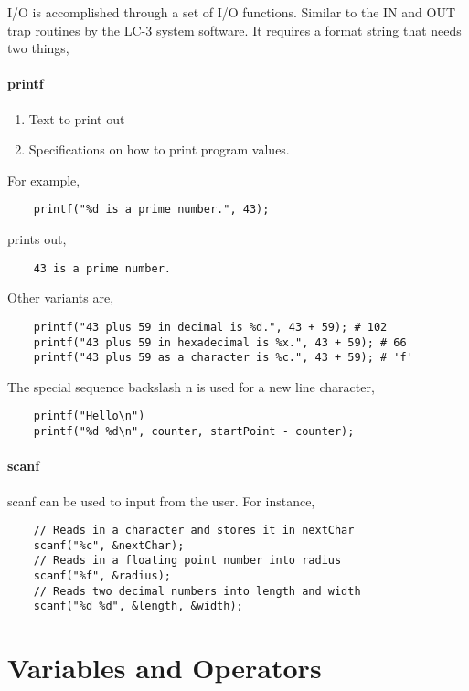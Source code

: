 \begin{enumerate}
    I/O is accomplished through a set of I/O functions. Similar to the IN and OUT trap routines by the LC-3 system software. It requires a format string that needs two things,

    \subsubsection{printf}
    \begin{enumerate}
        \item Text to print out
        \item  Specifications on how to print program values.
    \end{enumerate}

    For example, 
    \begin{verbatim}
    printf("%d is a prime number.", 43);
    \end{verbatim}
    prints out, 
    \begin{verbatim}
    43 is a prime number.
    \end{verbatim}

    Other variants are, 
    \begin{verbatim}
    printf("43 plus 59 in decimal is %d.", 43 + 59); # 102
    printf("43 plus 59 in hexadecimal is %x.", 43 + 59); # 66
    printf("43 plus 59 as a character is %c.", 43 + 59); # 'f'
    \end{verbatim}
                

    The special sequence backslash n is used for a new line character,
    \begin{verbatim}
    printf("Hello\n")
    printf("%d %d\n", counter, startPoint - counter);
    \end{verbatim}

    \subsubsection{scanf}
    scanf can be used to input from the user. For instance, 

    \begin{verbatim}
    // Reads in a character and stores it in nextChar
    scanf("%c", &nextChar);
    // Reads in a floating point number into radius
    scanf("%f", &radius);
    // Reads two decimal numbers into length and width
    scanf("%d %d", &length, &width);
    \end{verbatim}
\end{enumerate}


\chapter{Variables and Operators}

